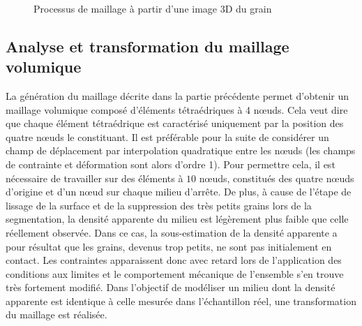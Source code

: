 		\begin{figure}\centering
			~\hfill
			\hfill
			\hfill~\\
			~\hfill
			\hfill
			\hfill~\\
			~\hfill
			\hfill
			\hfill~
			\caption{\label{fig05:process_maillage}Processus de maillage à partir d'une image 3D du grain}
		\end{figure}
	\subsection{Analyse et transformation du maillage volumique}
	\label{para05:maillage_correction}
		La génération du maillage décrite dans la partie précédente permet d'obtenir un maillage volumique composé d'éléments tétraédriques à 4 n\oe{}uds. Cela veut dire que chaque élément tétraédrique est caractérisé uniquement par la position des quatre n\oe{}uds le constituant. Il est préférable pour la suite de considérer un champ de déplacement par interpolation quadratique entre les n\oe{}uds (les champs de contrainte et déformation sont alors d'ordre \num{1}). Pour permettre cela, il est nécessaire de travailler sur des éléments à $10$ n\oe{}uds, constitués des quatre n\oe{}uds d'origine et d'un n\oe{}ud sur chaque milieu d'arrête. De plus, à cause de l'étape de lissage de la surface et de la suppression des très petits grains lors de la segmentation, la densité apparente du milieu est légèrement plus faible que celle réellement observée. Dans ce cas, la sous-estimation de la densité apparente a pour résultat que les grains, devenus trop petits, ne sont pas initialement en contact. Les contraintes apparaissent donc avec retard lors de l'application des conditions aux limites et le comportement mécanique de l'ensemble s'en trouve très fortement modifié. Dans l'objectif de modéliser un milieu dont la densité apparente est identique à celle mesurée dans l'échantillon réel, une transformation du maillage est réalisée.
